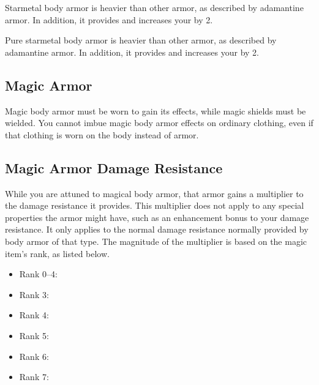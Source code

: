        Starmetal body armor is heavier than other armor, as described by adamantine armor.
      In addition, it provides   and increases your  by 2.

       Pure starmetal body armor is heavier than other armor, as described by adamantine armor.
      In addition, it provides   and increases your  by 2.

      \begin{longcolumn}
        \section{Magic Armor}
          \begin{longtablepreface}
            Magic body armor must be worn to gain its effects, while magic shields must be wielded.
            You cannot imbue magic body armor effects on ordinary clothing, even if that clothing is worn on the body instead of armor.

            \subsection{Magic Armor Damage Resistance}\label{Magic Armor Damage Resistance}
              While you are attuned to magical body armor, that armor gains a multiplier to the damage resistance it provides.
              This multiplier does not apply to any special properties the armor might have, such as an enhancement bonus to your damage resistance.
              It only applies to the normal damage resistance normally provided by body armor of that type.
              The magnitude of the multiplier is based on the magic item's rank, as listed below.

              \begin{itemize}
                \item Rank 0--4: 
                \item Rank 3: 
                \item Rank 4: 
                \item Rank 5: 
                \item Rank 6: 
                \item Rank 7: 
              \end{itemize}
          \end{longtablepreface}

          

      \end{longcolumn}

